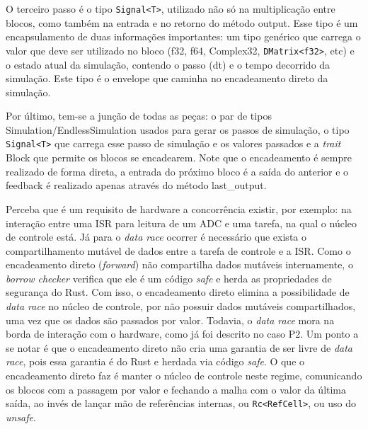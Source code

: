 O terceiro passo é o tipo \texttt{Signal<T>}, utilizado não só na multiplicação entre blocos, como também na entrada e no retorno do método output. Esse tipo é um encapsulamento de duas informações importantes: um tipo genérico que carrega o valor que deve ser utilizado no bloco (f32, f64, Complex32, \texttt{DMatrix<f32>}, etc) e o estado atual da simulação, contendo o passo (dt) e o tempo decorrido da simulação. Este tipo é o envelope que caminha no encadeamento direto da simulação.

Por último, tem-se a junção de todas as peças: o par de tipos Simulation/EndlessSimulation usados para gerar os passos de simulação, o tipo \texttt{Signal<T>} que carrega esse passo de simulação e os valores passados e a \textit{trait} Block que permite os blocos se encadearem. Note que o encadeamento é sempre realizado de forma direta, a entrada do próximo bloco é a saída do anterior e o feedback é realizado apenas através do método last\_output.

Perceba que é um requisito de hardware a concorrência existir, por exemplo: na interação entre uma \ac{ISR} para leitura de um \ac{ADC} e uma tarefa, na qual o núcleo de controle está. Já para o \textit{data race} ocorrer é necessário que exista o compartilhamento mutável de dados entre a tarefa de controle e a \ac{ISR}. Como o encadeamento direto (\textit{forward}) não compartilha dados mutáveis internamente, o \textit{borrow checker} verifica que ele é um código \textit{safe} e herda as propriedades de segurança do Rust. Com isso, o encadeamento direto elimina a possibilidade de \textit{data race} no núcleo de controle, por não possuir dados mutáveis compartilhados, uma vez que os dados são passados por valor. Todavia, o \textit{data race} mora na borda de interação com o hardware, como já foi descrito no caso P2. Um ponto a se notar é que o encadeamento direto não cria uma garantia de ser livre de \textit{data race}, pois essa garantia é do Rust e herdada via código \textit{safe}. O que o encadeamento direto faz é manter o núcleo de controle neste regime, comunicando os blocos com a passagem por valor e fechando a malha com o valor da última saída, ao invés de lançar mão de referências internas, ou \texttt{Rc<RefCell>}, ou uso do \textit{unsafe}.

